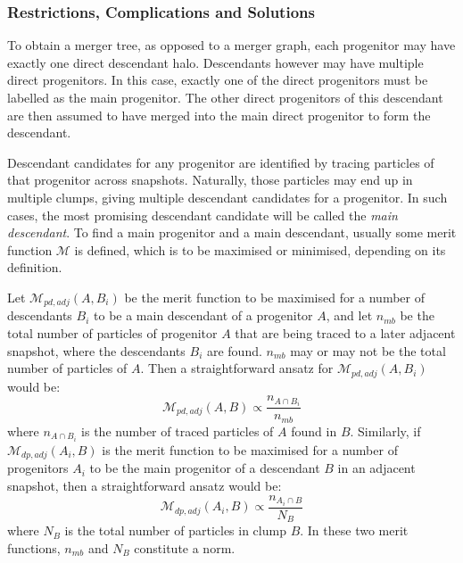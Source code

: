 \subsubsection{Restrictions, Complications and Solutions}

To obtain a merger tree, as opposed to a merger graph, each progenitor may have exactly one direct descendant halo. 
Descendants however may have multiple direct progenitors. 
In this case, exactly one of the direct progenitors must be labelled as the main progenitor.
The other direct progenitors of this descendant are then assumed to have merged into the main direct progenitor to form the descendant.

Descendant candidates for any progenitor are identified by tracing particles of that progenitor across snapshots.
Naturally, those particles may end up in multiple clumps, giving multiple descendant candidates for a progenitor.
In such cases, the most promising descendant candidate will be called the \emph{main descendant}.
To find a main progenitor and a main descendant, usually some merit function $\mathcal{M}$ is defined, which is to be maximised or minimised, depending on its definition.

Let $\mathcal{M}_{pd,adj}(A,B_i)$ be the merit function to be maximised for a number of descendants $B_i$ to be a main descendant of a progenitor $A$, and let $n_{mb}$ be the total number of particles of progenitor $A$ that are being traced to a later adjacent snapshot, where the descendants $B_i$ are found.
$n_{mb}$ may or may not be the total number of particles of $A$. 
Then a straightforward ansatz for $\mathcal{M}_{pd,adj}(A,B_i)$ would be:
\begin{equation}
    \mathcal{M}_{pd,adj}(A,B) \propto \frac{n_{A \cap B_i}}{n_{mb}}
\end{equation}
where $n_{A \cap B_i}$ is the number of traced particles of $A$ found in $B$.
Similarly, if $\mathcal{M}_{dp,adj}(A_i,B)$ is the merit function to be maximised for a number of progenitors $A_i$ to be the main progenitor of a descendant $B$ in an adjacent snapshot, then a straightforward ansatz would be:
\begin{equation}
    \mathcal{M}_{dp,adj}(A_i,B) \propto \frac{n_{A_i \cap B}}{N_B}
\end{equation}
where $N_B$ is the total number of particles in clump $B$.
In these two merit functions, $n_{mb}$ and $N_B$ constitute a norm.

